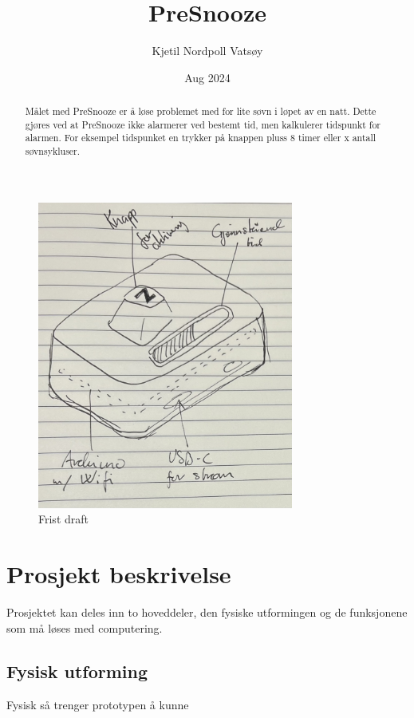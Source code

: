 \documentclass[12pt, a4paper]{article}
\begin{document}
\title{PreSnooze} 
\author{Kjetil Nordpoll Vatsøy}
\date{Aug 2024}

\maketitle

\pagebreak

\begin{figure}[h]
\centering
\includegraphics[width=0.75\textwidth]{IMG_2505.png}
\caption{Frist draft}
\end{figure}   

\begin{abstract}
Målet med PreSnooze er å løse problemet med for lite søvn i løpet av en natt. 
Dette gjøres ved at PreSnooze ikke alarmerer ved bestemt tid, men kalkulerer tidspunkt for alarmen. For eksempel tidspunket en trykker på knappen pluss 8 timer eller x antall søvnsykluser.
\end{abstract}

\pagebreak

\section{Prosjekt beskrivelse}

Prosjektet kan deles inn to hoveddeler, den fysiske utformingen og de funksjonene som må løses med computering. 
\subsection*{Fysisk utforming}
Fysisk så trenger prototypen å kunne 
\end{document}
